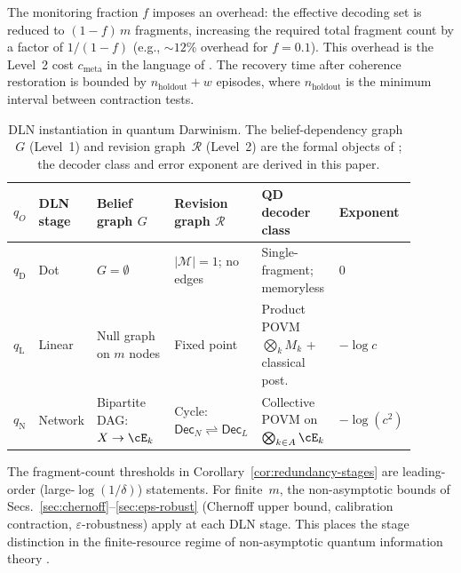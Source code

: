 \noindent
The monitoring fraction $f$ imposes an overhead: the effective decoding
set is reduced to $(1-f)\,m$ fragments, increasing the required total
fragment count by a factor of $1/(1-f)$ (e.g., ${\sim}12\%$ overhead
for $f=0.1$).
This overhead is the Level~2 cost
$c_{\mathrm{meta}}$ in the language of
\citep[Proposition~1]{WuDLNCompression2026preprint}.
The recovery time after coherence restoration is bounded by
$n_{\mathrm{holdout}}+w$ episodes, where $n_{\mathrm{holdout}}$ is the
minimum interval between contraction tests.


\begin{table}[t]
\caption{%
DLN instantiation in quantum Darwinism.
The belief-dependency graph~$G$ (Level~1) and revision
graph~$\mathcal{R}$ (Level~2) are the formal objects of
\citet{WuDLNCompression2026preprint};
the decoder class and error exponent are derived in this paper.
}
\label{tab:q-dln-mapping}
\centering
\small
\begin{tabular}{
  p{0.06\linewidth}
  p{0.10\linewidth}
  p{0.22\linewidth}
  p{0.22\linewidth}
  p{0.20\linewidth}
  p{0.10\linewidth}
}
\toprule
$q_O$ & DLN stage & Belief graph $G$
      & Revision graph $\mathcal{R}$
      & QD decoder class
      & Exponent \\
\midrule
$q_{\mathrm{D}}$ & Dot
  & $G=\emptyset$
  & $|\mathcal{M}|{=}1$; no edges
  & Single-fragment; memoryless
  & $0$ \\[3pt]
$q_{\mathrm{L}}$ & Linear
  & Null graph on $m$ nodes
  & Fixed point
  & Product POVM $\bigotimes_k M_k$ + classical post.
  & $-\log c$ \\[3pt]
$q_{\mathrm{N}}$ & Network
  & Bipartite DAG: $X\to\cE_k$
  & Cycle: $\mathsf{Dec}_N \rightleftharpoons \mathsf{Dec}_L$
  & Collective POVM on $\bigotimes_{k\in A}\cE_k$
  & $-\log(c^2)$ \\
\bottomrule
\end{tabular}
\end{table}


\begin{remark}
\label{rem:finite-resource}
The fragment-count thresholds in
Corollary~\ref{cor:redundancy-stages} are leading-order
(large-$\log(1/\delta)$) statements.
For finite~$m$, the non-asymptotic bounds of
Secs.~\ref{sec:chernoff}--\ref{sec:eps-robust} (Chernoff upper bound,
calibration contraction, $\varepsilon$-robustness) apply at each DLN
stage.
This places the stage distinction in the finite-resource regime of
non-asymptotic quantum information theory
\citep{Tomamichel2016,AudenaertMosonyiVerstraete2012,
ChengDattaLiuNuradhaSalzmannWilde2025}.
\end{remark}


